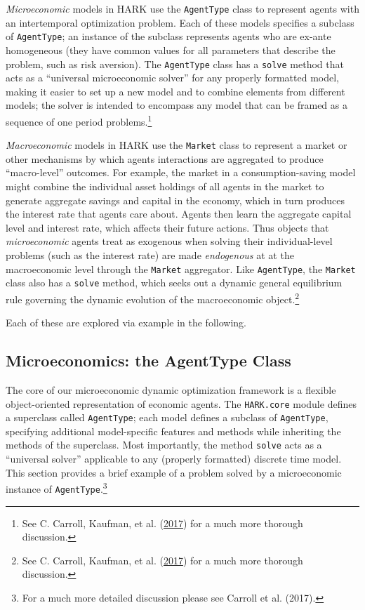 \message{ !name(ccarroll_et_al_scipy_2018.tex)}\documentclass[10pt,twocolumn]{article}
\let\rmarkdownfootnote\footnote%
\def\footnote{\protect\rmarkdownfootnote}
\begin{document}
\emph{Microeconomic} models in HARK use the \texttt{AgentType} class to
represent agents with an intertemporal optimization problem. Each of
these models specifies a subclass of \texttt{AgentType}; an instance of
the subclass represents agents who are ex-ante homogeneous (they have
common values for all parameters that describe the problem, such as risk
aversion). The \texttt{AgentType} class has a \texttt{solve} method that
acts as a ``universal microeconomic solver'' for any properly formatted
model, making it easier to set up a new model and to combine elements
from different models; the solver is intended to encompass any model
that can be framed as a sequence of one period problems.\footnote{See C.
  Carroll, Kaufman, et al.
  (\protect\hyperlink{ref-carroll2017harkmanual}{2017}) for a much more
  thorough discussion.}

\emph{Macroeconomic} models in HARK use the \texttt{Market} class to
represent a market or other mechanisms by which agents interactions are
aggregated to produce ``macro-level'' outcomes. For example, the market
in a consumption-saving model might combine the individual asset
holdings of all agents in the market to generate aggregate savings and
capital in the economy, which in turn produces the interest rate that
agents care about. Agents then learn the aggregate capital level and
interest rate, which affects their future actions. Thus objects that
\emph{microeconomic} agents treat as exogenous when solving their
individual-level problems (such as the interest rate) are made
\emph{endogenous} at at the macroeconomic level through the
\texttt{Market} aggregator. Like \texttt{AgentType}, the \texttt{Market}
class also has a \texttt{solve} method, which seeks out a dynamic
general equilibrium rule governing the dynamic evolution of the
macroeconomic object.\footnote{See C. Carroll, Kaufman, et al.
  (\protect\hyperlink{ref-carroll2017harkmanual}{2017}) for a much more
  thorough discussion.}

Each of these are explored via example in the following.

\subsection{Microeconomics: the AgentType
Class}\label{microeconomics-the-agenttype-class}

The core of our microeconomic dynamic optimization framework is a
flexible object-oriented representation of economic agents. The
\texttt{HARK.core} module defines a superclass called \texttt{AgentType};
each model defines a subclass of \texttt{AgentType}, specifying
additional model-specific features and methods while inheriting the
methods of the superclass. Most importantly, the method \texttt{solve}
acts as a ``universal solver'' applicable to any (properly formatted)
discrete time model. This section provides a brief example of a problem
solved by a microeconomic instance of \texttt{AgentType}.\footnote{For a
  much more detailed discussion please see Carroll et al. (2017).}
\end{document}

